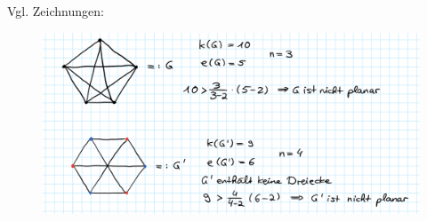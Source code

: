 \begin{problem}[1b]
  Vgl. Zeichnungen:
  \begin{figure}[H]
    \includegraphics[width=\linewidth]{assets/images/Abb1-15-12.png}
  \end{figure}
\end{problem}

